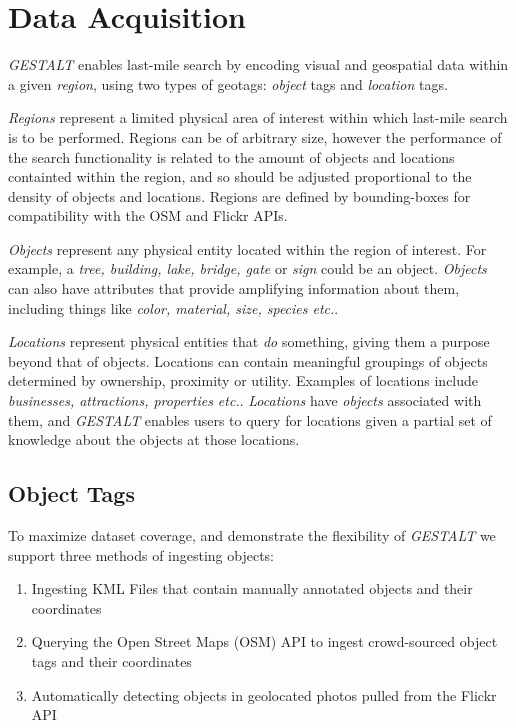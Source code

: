 \section{Data Acquisition}
\label{section:data}

\emph{GESTALT} enables last-mile search by encoding visual and geospatial data within a given \emph{region}, using two types of geotags: \emph{object} tags and \emph{location} tags.

\emph{Regions} represent a limited physical area of interest within which last-mile search is to be performed. 
Regions can be of arbitrary size, however the performance of the search functionality is related to the amount of objects and locations containted within the region, and so should be adjusted proportional to the density of objects and locations. 
Regions are defined by bounding-boxes for compatibility with the OSM and Flickr APIs.

\emph{Objects} represent any physical entity located within the region of interest. 
For example, a \textit{tree, building, lake, bridge, gate} or \textit{sign} could be an object. 
\textit{Objects} can also have attributes that provide amplifying information about them, including things like \textit{color, material, size, species etc.}. 

\emph{Locations} represent physical entities that \textit{do} something, giving them a purpose beyond that of objects. 
Locations can contain meaningful groupings of objects determined by ownership, proximity or utility. 
Examples of locations include \textit{businesses, attractions, properties etc.}. 
\textit{Locations} have \textit{objects} associated with them, and \emph{GESTALT} enables users to query for locations given a partial set of knowledge about the objects at those locations.

\subsection{Object Tags}
To maximize dataset coverage, and demonstrate the flexibility of \emph{GESTALT} we support three methods of ingesting objects:
\begin{enumerate}
    \item Ingesting KML Files that contain manually annotated objects and their coordinates 
    \item Querying the Open Street Maps (OSM) API to ingest crowd-sourced object tags and their coordinates
    \item Automatically detecting objects in geolocated photos pulled from the Flickr API 
\end{enumerate}

